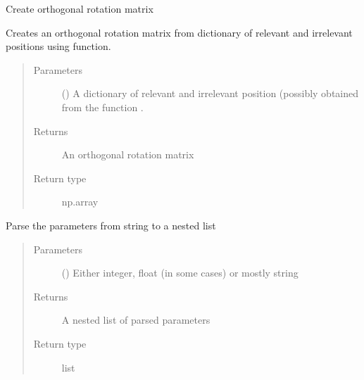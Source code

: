 \documentclass[letterpaper,10pt,english]{sphinxmanual}
\begin{document}
\begin{fulllineitems}
\label{\detokenize{Utilities:pysimrel.utilities.get_rotation}}
Create orthogonal rotation matrix

Creates an orthogonal rotation matrix from dictionary of relevant and irrelevant
positions using  function.
\begin{quote}\begin{description}
\item[{Parameters}] \leavevmode
{} () \textendash{} A dictionary of relevant and irrelevant position (possibly obtained from the function .

\item[{Returns}] \leavevmode
An orthogonal rotation matrix

\item[{Return type}] \leavevmode
np.array

\end{description}\end{quote}

\end{fulllineitems}


\begin{fulllineitems}
\label{\detokenize{Utilities:pysimrel.utilities.parse_param}}
Parse the parameters from string to a nested list
\begin{quote}\begin{description}
\item[{Parameters}] \leavevmode
{} (\sphinxstyleliteralemphasis{\sphinxupquote{, }}) \textendash{} Either integer, float (in some cases) or mostly string

\item[{Returns}] \leavevmode
A nested list of parsed parameters

\item[{Return type}] \leavevmode
list

\end{description}\end{quote}

\end{fulllineitems}
\end{document}
